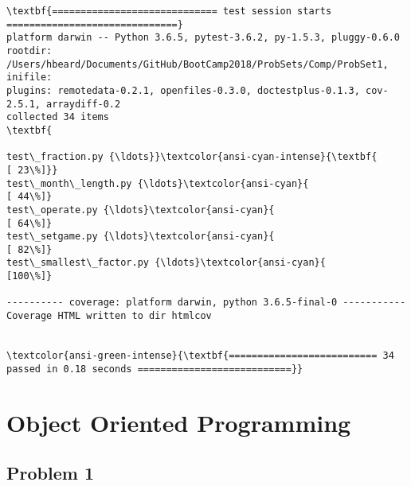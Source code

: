 \documentclass[11pt]{article}
\begin{document}
    \begin{Verbatim}[commandchars=\\\{\}]
\textbf{============================= test session starts ==============================}
platform darwin -- Python 3.6.5, pytest-3.6.2, py-1.5.3, pluggy-0.6.0
rootdir: /Users/hbeard/Documents/GitHub/BootCamp2018/ProbSets/Comp/ProbSet1, inifile:
plugins: remotedata-0.2.1, openfiles-0.3.0, doctestplus-0.1.3, cov-2.5.1, arraydiff-0.2
collected 34 items                                                             \textbf{

test\_fraction.py {\ldots}}\textcolor{ansi-cyan-intense}{\textbf{                                                [ 23\%]}}
test\_month\_length.py {\ldots}\textcolor{ansi-cyan}{                                             [ 44\%]}
test\_operate.py {\ldots}\textcolor{ansi-cyan}{                                                  [ 64\%]}
test\_setgame.py {\ldots}\textcolor{ansi-cyan}{                                                   [ 82\%]}
test\_smallest\_factor.py {\ldots}\textcolor{ansi-cyan}{                                           [100\%]}

---------- coverage: platform darwin, python 3.6.5-final-0 -----------
Coverage HTML written to dir htmlcov


\textcolor{ansi-green-intense}{\textbf{========================== 34 passed in 0.18 seconds ===========================}}

    \end{Verbatim}

    \section{Object Oriented Programming}\label{object-oriented-programming}

    \subsection*{Problem 1}\label{problem-1}
\end{document}
